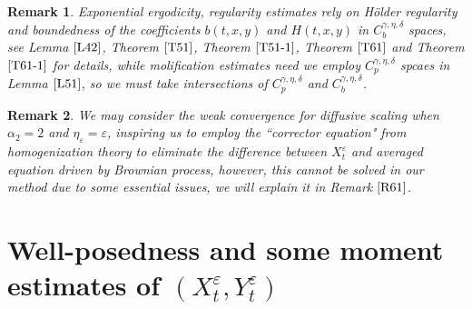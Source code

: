 \documentclass[11pt,reqno]{amsart}
\newtheorem{remark}{\indent Remark}[section]
\numberwithin{equation}{section}
\begin{document}
\begin{remark}
	Exponential ergodicity, regularity estimates rely on H\"{o}lder regularity and boundedness of the coefficients $b(t,x,y)$ and $H(t,x,y)$ in $C^{\gamma,\eta,\delta}_b$ spaces, see Lemma $\ref{L42}$, Theorem $\ref{T51}$, Theorem $\ref{T51-1}$, Theorem $\ref{T61}$ and Theorem $\ref{T61-1}$ for details, while molification estimates need we employ $C^{\gamma,\eta,\delta}_p$ spcaes in Lemma $\ref{L51}$, so we must take intersections of $C^{\gamma,\eta,\delta}_p$ and $C^{\gamma,\eta,\delta}_b$.
\end{remark}

\begin{remark}
We may consider the weak convergence for diffusive scaling when  $\alpha_{2}=2$ and $\eta_{\varepsilon}=\varepsilon$, inspiring us to  employ the ``corrector equation" from homogenization theory to eliminate the difference between $X_{t}^{\varepsilon}$ and averaged equation driven by Brownian process,  however, this cannot be solved in our method due to some essential issues, we will explain it in Remark $\ref{R61}$.
\end{remark}







\section{Well-posedness and some moment estimates of $(X_{t}^{\varepsilon},Y_{t}^{\varepsilon})$ }
\end{document}
